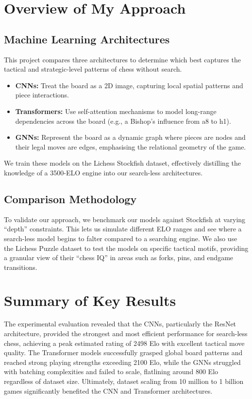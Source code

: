 \section{Overview of My Approach}
\subsection{Machine Learning Architectures}
This project compares three architectures to determine which best captures the tactical and strategic-level patterns of chess without search.

\begin{itemize}
    \item \textbf{CNNs:} Treat the board as a 2D image, capturing local spatial patterns and piece interactions.
    \item \textbf{Transformers:} Use self-attention mechanisms to model long-range dependencies across the board (e.g., a Bishop's influence from a8 to h1).
    \item \textbf{GNNs:} Represent the board as a dynamic graph where pieces are nodes and their legal moves are edges, emphasising the relational geometry of the game.
\end{itemize}

We train these models on the Lichess Stockfish dataset, effectively distilling the knowledge of a 3500-ELO engine into our search-less architectures.

\subsection{Comparison Methodology}
To validate our approach, we benchmark our models against Stockfish at varying ``depth'' constraints. This lets us simulate different ELO ranges and see where a search-less model begins to falter compared to a searching engine. We also use the Lichess Puzzle dataset to test the models on specific tactical motifs, providing a granular view of their ``chess IQ'' in areas such as forks, pins, and endgame transitions.

\section{Summary of Key Results}
The experimental evaluation revealed that the CNNs, particularly the ResNet architecture, provided the strongest and most efficient performance for search-less chess, achieving a peak estimated rating of 2498 Elo with excellent tactical move quality. The Transformer models successfully grasped global board patterns and reached strong playing strengths exceeding 2100 Elo, while the GNNs struggled with batching complexities and failed to scale, flatlining around 800 Elo regardless of dataset size. Ultimately, dataset scaling from 10 million to 1 billion games significantly benefited the CNN and Transformer architectures.

